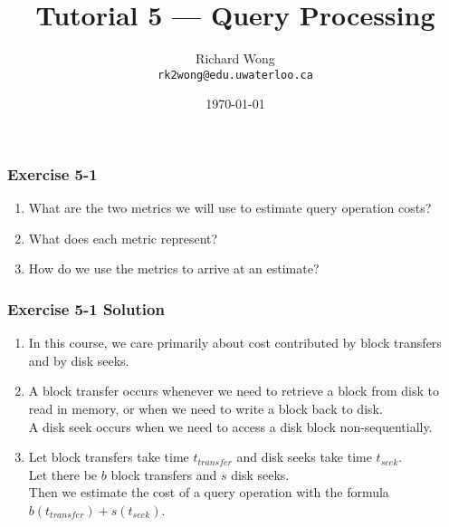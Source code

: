 

\title{Tutorial 5 --- Query Processing }

\author{Richard Wong \\ \small \texttt{rk2wong@edu.uwaterloo.ca}}
\date{\today}




\begin{frame}
  \titlepage

\end{frame}


\begin{frame}
\frametitle{Exercise 5-1}

\begin{enumerate}
  \item What are the two metrics we will use to estimate query operation costs?
  \item What does each metric represent?
  \item How do we use the metrics to arrive at an estimate?
\end{enumerate}

\end{frame}


\begin{frame}
\frametitle{Exercise 5-1 Solution}

\begin{enumerate}
  \item In this course, we care primarily about cost contributed by block transfers and by disk seeks.
  \item A block transfer occurs whenever we need to retrieve a block from disk to read in memory, or when we need to write a block back to disk. \\
    A disk seek occurs when we need to access a disk block non-sequentially.
  \item Let block transfers take time $t_{transfer}$ and disk seeks take time $t_{seek}$. \\
    Let there be $b$ block transfers and $s$ disk seeks. \\
    Then we estimate the cost of a query operation with the formula $b(t_{transfer}) + s(t_{seek})$.
\end{enumerate}

\end{frame}


